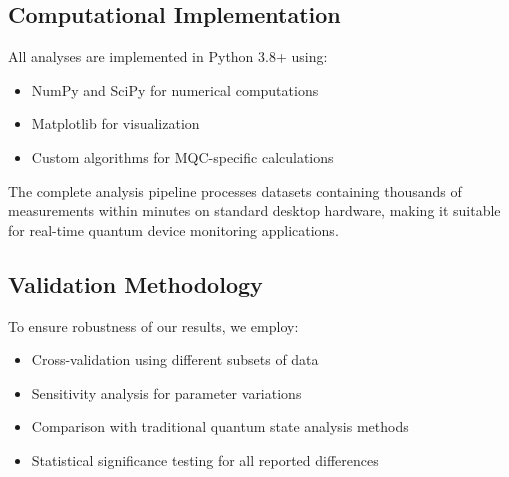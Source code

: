 \subsection{Computational Implementation}

All analyses are implemented in Python 3.8+ using:
\begin{itemize}
\item NumPy and SciPy for numerical computations
\item Matplotlib for visualization
\item Custom algorithms for MQC-specific calculations
\end{itemize}

The complete analysis pipeline processes datasets containing thousands of measurements within minutes on standard desktop hardware, making it suitable for real-time quantum device monitoring applications.

\subsection{Validation Methodology}

To ensure robustness of our results, we employ:
\begin{itemize}
\item Cross-validation using different subsets of data
\item Sensitivity analysis for parameter variations
\item Comparison with traditional quantum state analysis methods
\item Statistical significance testing for all reported differences
\end{itemize}